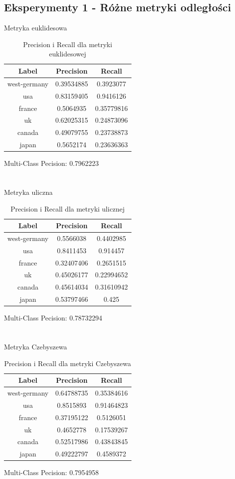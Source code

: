 \documentclass{classrep}
\begin{document}
\subsection{Eksperymenty 1 - Różne metryki odległości}
Metryka euklidesowa
\begin{table}[H]
\begin{tabular}{|c|c|c|}
\hline
Label        & Precision  & Recall     \\ \hline
west-germany & 0.39534885 & 0.3923077  \\ \hline
usa          & 0.83159405 & 0.9416126  \\ \hline
france       & 0.5064935  & 0.35779816 \\ \hline
uk           & 0.62025315 & 0.24873096 \\ \hline
canada       & 0.49079755 & 0.23738873 \\ \hline
japan        & 0.5652174  & 0.23636363 \\ \hline
\end{tabular}
\caption{Precision i Recall dla metryki euklidesowej}
\end{table}
Multi-Class Pecision: 0.7962223\\
\\
\\
Metryka uliczna
\begin{table}[H]
\begin{tabular}{|c|c|c|}
\hline
Label        & Precision  & Recall     \\ \hline
west-germany & 0.5566038  & 0.4402985  \\ \hline
usa          & 0.8411453  & 0.914457   \\ \hline
france       & 0.32407406 & 0.2651515  \\ \hline
uk           & 0.45026177 & 0.22994652 \\ \hline
canada       & 0.45614034 & 0.31610942 \\ \hline
japan        & 0.53797466 & 0.425      \\ \hline
\end{tabular}
\caption{Precision i Recall dla metryki ulicznej}
\end{table}
Multi-Class Pecision: 0.78732294\\
\\
\\
Metryka Czebyszewa
\begin{table}[H]
\begin{tabular}{|c|c|c|}
\hline
Label        & Precision  & Recall     \\ \hline
west-germany & 0.64788735 & 0.35384616 \\ \hline
usa          & 0.8515893  & 0.91464823 \\ \hline
france       & 0.37195122 & 0.5126051  \\ \hline
uk           & 0.4652778  & 0.17539267 \\ \hline
canada       & 0.52517986 & 0.43843845 \\ \hline
japan        & 0.49222797 & 0.4589372  \\ \hline
\end{tabular}
\caption{Precision i Recall dla metryki Czebyszewa}
\end{table}
Multi-Class Pecision: 0.7954958
\end{document}
